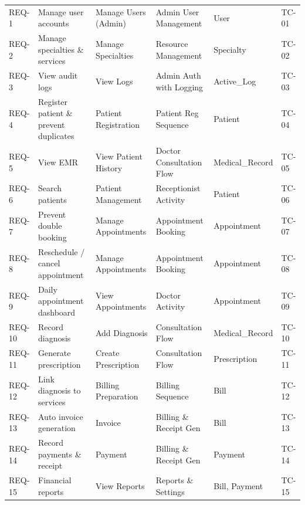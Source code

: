 \begin{tabularx}{\textwidth}{l L L L l l}
	REQ-1  & Manage user accounts & Manage Users (Admin) & Admin User Management & User & TC-01 \\ \addlinespace
	REQ-2  & Manage specialties \& services & Manage Specialties & Resource Management & Specialty & TC-02 \\ \addlinespace
	REQ-3  & View audit logs & View Logs & Admin Auth with Logging & Active\_Log & TC-03 \\ \addlinespace
	REQ-4  & Register patient \& prevent duplicates & Patient Registration & Patient Reg Sequence & Patient & TC-04 \\ \addlinespace
	REQ-5  & View EMR & View Patient History & Doctor Consultation Flow & Medical\_Record & TC-05 \\ \addlinespace
	REQ-6  & Search patients & Patient Management & Receptionist Activity & Patient & TC-06 \\ \addlinespace
	REQ-7  & Prevent double booking & Manage Appointments & Appointment Booking & Appointment & TC-07 \\ \addlinespace
	REQ-8  & Reschedule / cancel appointment & Manage Appointments & Appointment Booking & Appointment & TC-08 \\ \addlinespace
	REQ-9  & Daily appointment dashboard & View Appointments & Doctor Activity & Appointment & TC-09 \\ \addlinespace
	REQ-10 & Record diagnosis & Add Diagnosis & Consultation Flow & Medical\_Record & TC-10 \\ \addlinespace
	REQ-11 & Generate prescription & Create Prescription & Consultation Flow & Prescription & TC-11 \\ \addlinespace
	REQ-12 & Link diagnosis to services & Billing Preparation & Billing Sequence & Bill & TC-12 \\ \addlinespace
	REQ-13 & Auto invoice generation & Invoice & Billing \& Receipt Gen & Bill & TC-13 \\ \addlinespace
	REQ-14 & Record payments \& receipt & Payment & Billing \& Receipt Gen & Payment & TC-14 \\ \addlinespace
	REQ-15 & Financial reports & View Reports & Reports \& Settings & Bill, Payment & TC-15 \\
	
	\bottomrule
\end{tabularx}